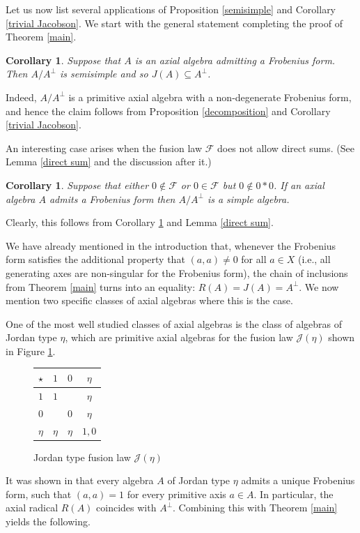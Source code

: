 \documentclass[12pt]{article}
\newtheorem{corollary}[theorem]{Corollary}
\newcommand\cF{\mathcal{F}}
\newcommand\cJ{\mathcal{J}}
\begin{document}
Let us now list several applications of Proposition \ref{semisimple} and Corollary 
\ref{trivial Jacobson}. We start with the general statement completing the proof of 
Theorem \ref{main}.  

\begin{corollary} \label{modulo A perp}
Suppose that $A$ is an axial algebra admitting a Frobenius form. Then $A/A^\perp$ is 
semisimple and so $J(A)\subseteq A^\perp$. 
\end{corollary}

Indeed, $A/A^\perp$ is a primitive axial algebra with a non-degenerate Frobenius 
form, and hence the claim follows from Proposition \ref{decomposition} and Corollary 
\ref{trivial Jacobson}.

An interesting case arises when the fusion law $\cF$ does not allow direct sums. (See 
Lemma \ref{direct sum} and the discussion after it.)

\begin{corollary}
Suppose that either $0\notin\cF$ or $0\in\cF$ but $0\notin 0\ast 0$. If an axial 
algebra $A$ admits a Frobenius form then $A/A^\perp$ is a simple algebra.
\end{corollary}

Clearly, this follows from Corollary \ref{modulo A perp} and Lemma \ref{direct sum}.

We have already mentioned in the introduction that, whenever the Frobenius form 
satisfies the additional property that $(a,a)\neq 0$ for all $a\in X$ (i.e., all 
generating axes are non-singular for the Frobenius form), the chain of inclusions 
from Theorem \ref{main} turns into an equality: $R(A)=J(A)=A^\perp$. We now mention 
two specific classes of axial algebras where this is the case.

One of the most well studied classes of axial algebras is the class of algebras of 
Jordan type $\eta$, which are primitive axial algebras for the fusion law $\cJ(\eta)$ shown in Figure \ref{Jordan type}.
%
\begin{figure}[ht]
\renewcommand{\arraystretch}{1.6}
\begin{center}
\begin{tabular}{|c||c|c|c|}
\hline
$\star$ & $1$ &$0$&$\eta$\\
\hline  \hline
$1$&$1$& &$\eta$\\
\hline
$0$& &$0$&$\eta$\\
\hline
$\eta$&$\eta$&$\eta$&$1,0$\\
\hline
\end{tabular}
\end{center}
\caption{Jordan type fusion law $\cJ(\eta)$}\label{Jordan type}
\end{figure}
%
It was shown in \cite{hss2} that every algebra $A$ of Jordan type $\eta$ admits a 
unique Frobenius form, such that $(a,a)=1$ for every primitive axis $a\in A$. In 
particular, the axial radical $R(A)$ coincides with $A^\perp$. Combining this with 
Theorem \ref{main} yields the following.
\end{document}
